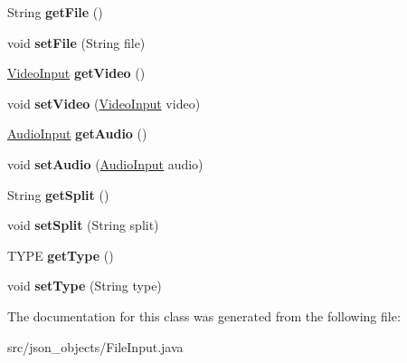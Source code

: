 \begin{DoxyCompactItemize}
\item 
\hypertarget{classjson__objects_1_1_file_input_a400a3cc9582af599321eff3fbb450b38}{
String {\bfseries getFile} ()}
\label{classjson__objects_1_1_file_input_a400a3cc9582af599321eff3fbb450b38}

\item 
\hypertarget{classjson__objects_1_1_file_input_a1962f18def8c819da9c99680d1273601}{
void {\bfseries setFile} (String file)}
\label{classjson__objects_1_1_file_input_a1962f18def8c819da9c99680d1273601}

\item 
\hypertarget{classjson__objects_1_1_file_input_a8fad75dde26cbef556beea7892035cc0}{
\hyperlink{classjson__objects_1_1_video_input}{VideoInput} {\bfseries getVideo} ()}
\label{classjson__objects_1_1_file_input_a8fad75dde26cbef556beea7892035cc0}

\item 
\hypertarget{classjson__objects_1_1_file_input_a92b33956e205a8b0ca5f4c7717643e58}{
void {\bfseries setVideo} (\hyperlink{classjson__objects_1_1_video_input}{VideoInput} video)}
\label{classjson__objects_1_1_file_input_a92b33956e205a8b0ca5f4c7717643e58}

\item 
\hypertarget{classjson__objects_1_1_file_input_a87f5720a00425b01e5fcc1cf780fd394}{
\hyperlink{classjson__objects_1_1_audio_input}{AudioInput} {\bfseries getAudio} ()}
\label{classjson__objects_1_1_file_input_a87f5720a00425b01e5fcc1cf780fd394}

\item 
\hypertarget{classjson__objects_1_1_file_input_ad134fd0773f6395d1eb1623108f2908a}{
void {\bfseries setAudio} (\hyperlink{classjson__objects_1_1_audio_input}{AudioInput} audio)}
\label{classjson__objects_1_1_file_input_ad134fd0773f6395d1eb1623108f2908a}

\item 
\hypertarget{classjson__objects_1_1_file_input_adcfd31d682033abadd05a7d8d188a66d}{
String {\bfseries getSplit} ()}
\label{classjson__objects_1_1_file_input_adcfd31d682033abadd05a7d8d188a66d}

\item 
\hypertarget{classjson__objects_1_1_file_input_ad447bb3275fb646b7eb3cca9367bd0bc}{
void {\bfseries setSplit} (String split)}
\label{classjson__objects_1_1_file_input_ad447bb3275fb646b7eb3cca9367bd0bc}

\item 
\hypertarget{classjson__objects_1_1_file_input_aee587203f189f3e04d89ed975a1dd25e}{
TYPE {\bfseries getType} ()}
\label{classjson__objects_1_1_file_input_aee587203f189f3e04d89ed975a1dd25e}

\item 
\hypertarget{classjson__objects_1_1_file_input_a3ee95459c0612ba0ca3fe6664cb6d2b4}{
void {\bfseries setType} (String type)}
\label{classjson__objects_1_1_file_input_a3ee95459c0612ba0ca3fe6664cb6d2b4}

\end{DoxyCompactItemize}


The documentation for this class was generated from the following file:\begin{DoxyCompactItemize}
\item 
src/json\_\-objects/FileInput.java\end{DoxyCompactItemize}
